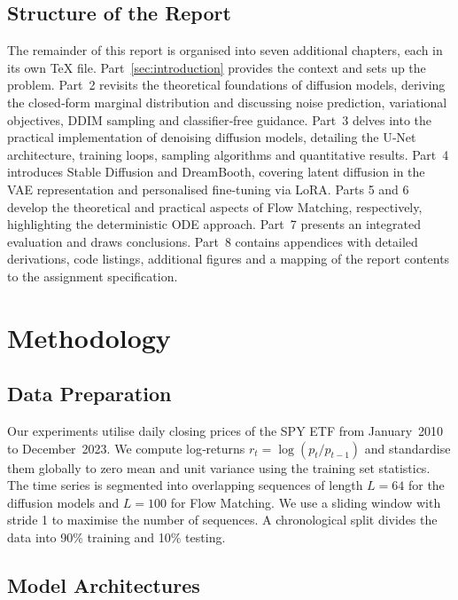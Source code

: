 \subsection{Structure of the Report}

The remainder of this report is organised into seven additional
chapters, each in its own \TeX{} file.  Part~\ref{sec:introduction}
provides the context and sets up the problem.  Part~2 revisits the
theoretical foundations of diffusion models, deriving the closed‑form
marginal distribution and discussing noise prediction, variational
objectives, DDIM sampling and classifier‑free guidance.  Part~3
delves into the practical implementation of denoising diffusion
models, detailing the U‑Net architecture, training loops, sampling
algorithms and quantitative results.  Part~4 introduces Stable
Diffusion and DreamBooth, covering latent diffusion in the VAE
representation and personalised fine‑tuning via LoRA.  Parts 5 and 6
develop the theoretical and practical aspects of Flow Matching,
respectively, highlighting the deterministic ODE approach.  Part~7
presents an integrated evaluation and draws conclusions.  Part~8
contains appendices with detailed derivations, code listings,
additional figures and a mapping of the report contents to the
assignment specification.

\section{Methodology}
\label{sec:methodology}

\subsection{Data Preparation}

Our experiments utilise daily closing prices of the SPY ETF from
January~2010 to December~2023.  We compute log‑returns
$r_t = \log(p_t / p_{t-1})$ and standardise them globally to zero
mean and unit variance using the training set statistics.  The time
series is segmented into overlapping sequences of length $L=64$ for
the diffusion models and $L=100$ for Flow Matching.  We use a
sliding window with stride 1 to maximise the number of sequences.  A
chronological split divides the data into 90\% training and 10\%
testing.

\subsection{Model Architectures}

